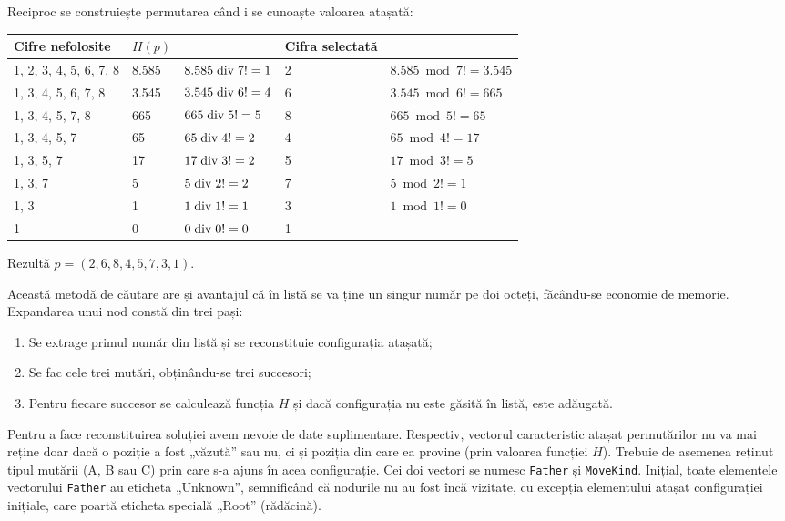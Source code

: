 Reciproc se construiește permutarea când i se cunoaște valoarea atașată:

\small{
  \begin{tabular}{|l|l|l|l|l|}
    \hline
    Cifre nefolosite       & $H(p)$ &                      & Cifra selectată & \\ \hline
    1, 2, 3, 4, 5, 6, 7, 8 & 8.585  & $8.585 \bdiv 7! = 1$ & 2 & $8.585 \bmod 7! = 3.545$ \\
    1, 3, 4, 5, 6, 7, 8    & 3.545  & $3.545 \bdiv 6! = 4$ & 6 & $3.545 \bmod 6! = 665$ \\
    1, 3, 4, 5, 7, 8       & 665    & $665 \bdiv 5! = 5$   & 8 & $665 \bmod 5! = 65$ \\
    1, 3, 4, 5, 7          & 65     & $65 \bdiv 4! = 2$    & 4 & $65 \bmod 4! = 17$ \\
    1, 3, 5, 7             & 17     & $17 \bdiv 3! = 2$    & 5 & $17 \bmod 3! = 5$ \\
    1, 3, 7                & 5      & $5 \bdiv 2! = 2$     & 7 & $5 \bmod 2! = 1$ \\
    1, 3                   & 1      & $1 \bdiv 1! = 1$     & 3 & $1 \bmod 1! = 0$ \\
    1                      & 0      & $0 \bdiv 0! = 0$     & 1 & \\ \hline
  \end{tabular}
}

Rezultă $p = (2, 6, 8, 4, 5, 7, 3, 1)$.

Această metodă de căutare are și avantajul că în listă se va ține un singur
număr pe doi octeți, făcându-se economie de memorie. Expandarea unui nod
constă din trei pași:

\begin{enumerate}

\item Se extrage primul număr din listă și se reconstituie configurația
  atașată;

\item Se fac cele trei mutări, obținându-se trei succesori;

\item Pentru fiecare succesor se calculează funcția $H$ și dacă configurația
  nu este găsită în listă, este adăugată.

\end{enumerate}

Pentru a face reconstituirea soluției avem nevoie de date
suplimentare. Respectiv, vectorul caracteristic atașat permutărilor nu va mai
reține doar dacă o poziție a fost „văzută” sau nu, ci și poziția din care ea
provine (prin valoarea funcției $H$). Trebuie de asemenea reținut tipul
mutării (A, B sau C) prin care s-a ajuns în acea configurație. Cei doi vectori
se numesc {\tt Father} și {\tt MoveKind}. Inițial, toate elementele vectorului
{\tt Father} au eticheta „Unknown”, semnificând că nodurile nu au fost încă
vizitate, cu excepția elementului atașat configurației inițiale, care poartă
eticheta specială „Root” (rădăcină).

